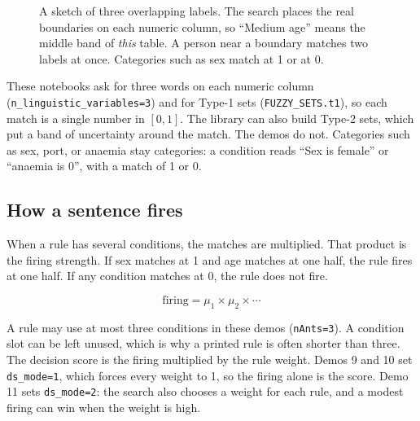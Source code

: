 \documentclass[11pt]{article}
\newcommand{\fn}[1]{\texttt{\small #1}}
\begin{document}
\begin{figure}[H]
\centering
{}
\caption{A sketch of three overlapping labels. The search places the real boundaries on each numeric column, so ``Medium age'' means the middle band of \emph{this} table. A person near a boundary matches two labels at once. Categories such as sex match at 1 or at 0.}
\end{figure}

\noindent
These notebooks ask for three words on each numeric column (\fn{n\_linguistic\_variables=3}) and for Type-1 sets (\fn{FUZZY\_SETS.t1}), so each match is a single number in \([0,1]\). The library can also build Type-2 sets, which put a band of uncertainty around the match. The demos do not. Categories such as sex, port, or anaemia stay categories: a condition reads ``Sex is female'' or ``anaemia is 0'', with a match of 1 or 0.

\subsection{How a sentence fires}

When a rule has several conditions, the matches are multiplied. That product is the firing strength. If sex matches at 1 and age matches at one half, the rule fires at one half. If any condition matches at 0, the rule does not fire.

\[
\text{firing} = \mu_1 \times \mu_2 \times \cdots
\]

A rule may use at most three conditions in these demos (\fn{nAnts=3}). A condition slot can be left unused, which is why a printed rule is often shorter than three. The decision score is the firing multiplied by the rule weight. Demos 9 and 10 set \fn{ds\_mode=1}, which forces every weight to 1, so the firing alone is the score. Demo 11 sets \fn{ds\_mode=2}: the search also chooses a weight for each rule, and a modest firing can win when the weight is high.
\end{document}
